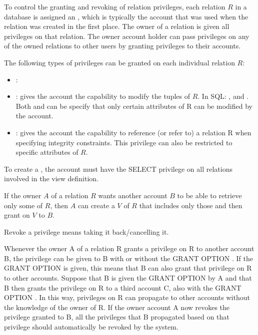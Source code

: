     \par To control the granting and revoking of relation privileges, each relation $R$ in a     database is assigned an , which is typically the account that was used when the relation was created in the first place. The owner of a relation is given all privileges on that relation. The owner account holder can pass privileges on any of the owned relations to other users by granting privileges to their accounts.
    \par The following types of privileges can be granted on each individual relation $R$:
    \begin{itemize}
      \item {}:
      \item {}: gives the account the capability to modify the tuples of $R$. In SQL: ,  and . Both  and  can be specify that only certain attributes of R can be modified by the account.
      \item {}: gives the account the capability to reference (or refer to) a relation R when specifying integrity constraints. This privilege can also be restricted to specific attributes of $R$.
    \end{itemize}
    \par To create a , the account must have the SELECT privilege on all relations involved in the view definition.

    \par If the owner $A$ of a relation $R$ wants another account $B$ to be able to retrieve only some  of $R$, then $A$ can create a  $V$ of $R$ that includes only those  and then grant  on $V$ to $B$.

    \par Revoke a privilege means taking it back/cancelling it.

    \par Whenever the owner A of a relation R grants a privilege on R to another account B, the privilege can be given to B with or without the GRANT OPTION . If the GRANT OPTION is given, this means that B can also grant that privilege on R to other accounts. Suppose that B is given the GRANT OPTION by A and that B then grants the privilege on R to a third account C, also with the GRANT OPTION . In this way, privileges on R can propagate to other accounts without the knowledge of the owner of R. If the owner account A now revokes the privilege granted to B, all the privileges that B propagated based on that privilege should automatically be revoked by the system.

